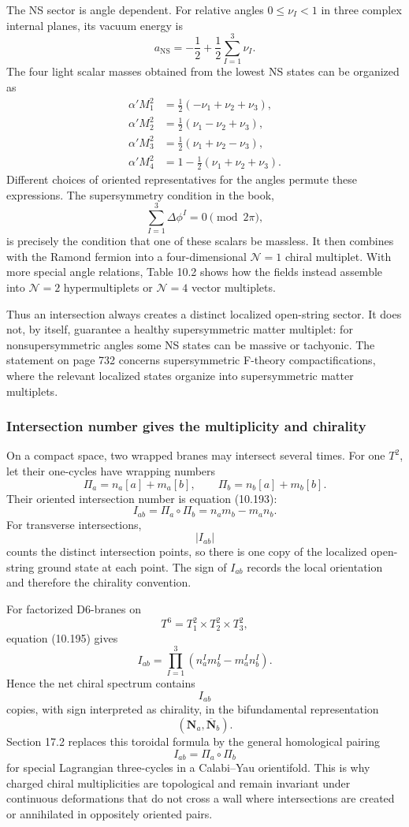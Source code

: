 \documentclass[
  10pt,
  a4paper,
  openany]{book}
\begin{document}
The NS sector is angle dependent. For relative angles \(0\leq\nu_I<1\)
in three complex internal planes, its vacuum energy is \[
a_{\mathrm{NS}}
=-\frac12
+\frac12\sum_{I=1}^3\nu_I.
\] The four light scalar masses obtained from the lowest NS states can
be organized as \[
\begin{aligned}
\alpha'M_1^2&=\frac12(-\nu_1+\nu_2+\nu_3),\\
\alpha'M_2^2&=\frac12(\nu_1-\nu_2+\nu_3),\\
\alpha'M_3^2&=\frac12(\nu_1+\nu_2-\nu_3),\\
\alpha'M_4^2&=1-\frac12(\nu_1+\nu_2+\nu_3).
\end{aligned}
\] Different choices of oriented representatives for the angles permute
these expressions. The supersymmetry condition in the book, \[
\sum_{I=1}^3\Delta\phi^I=0
\pmod{2\pi},
\] is precisely the condition that one of these scalars be massless. It
then combines with the Ramond fermion into a four-dimensional
\(\mathcal N=1\) chiral multiplet. With more special angle relations,
Table 10.2 shows how the fields instead assemble into \(\mathcal N=2\)
hypermultiplets or \(\mathcal N=4\) vector multiplets.

Thus an intersection always creates a distinct localized open-string
sector. It does not, by itself, guarantee a healthy supersymmetric
matter multiplet: for nonsupersymmetric angles some NS states can be
massive or tachyonic. The statement on page 732 concerns supersymmetric
F-theory compactifications, where the relevant localized states organize
into supersymmetric matter multiplets.

\subsubsection{Intersection number gives the multiplicity and
chirality}\label{intersection-number-gives-the-multiplicity-and-chirality}

On a compact space, two wrapped branes may intersect several times. For
one \(T^2\), let their one-cycles have wrapping numbers \[
\Pi_a=n_a[a]+m_a[b],
\qquad
\Pi_b=n_b[a]+m_b[b].
\] Their oriented intersection number is equation (10.193): \[
\boxed{
I_{ab}
=\Pi_a\circ\Pi_b
=n_am_b-m_an_b
}.
\] For transverse intersections, \[
|I_{ab}|
\] counts the distinct intersection points, so there is one copy of the
localized open-string ground state at each point. The sign of \(I_{ab}\)
records the local orientation and therefore the chirality convention.

For factorized D6-branes on \[
T^6=T^2_1\times T^2_2\times T^2_3,
\] equation (10.195) gives \[
\boxed{
I_{ab}
=\prod_{I=1}^3
\left(n_a^Im_b^I-m_a^In_b^I\right)
}.
\] Hence the net chiral spectrum contains \[
I_{ab}
\] copies, with sign interpreted as chirality, in the bifundamental
representation \[
(\mathbf N_a,\overline{\mathbf N}_b).
\] Section 17.2 replaces this toroidal formula by the general
homological pairing \[
I_{ab}=\Pi_a\circ\Pi_b
\] for special Lagrangian three-cycles in a Calabi--Yau orientifold.
This is why charged chiral multiplicities are topological and remain
invariant under continuous deformations that do not cross a wall where
intersections are created or annihilated in oppositely oriented pairs.
\end{document}
